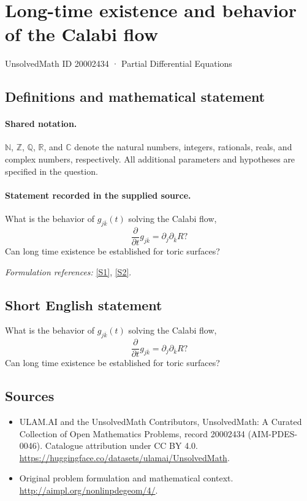 \documentclass[11pt]{article}
\newcommand{\sref}[2]{\hyperlink{source:#1:#2}{[S#2]}}
\begin{document}
\setcounter{section}{20002433}
\section{Long-time existence and behavior of the Calabi flow}\label{20002434}
{\small UnsolvedMath ID 20002434 · Partial Differential Equations}
\subsection{Definitions and mathematical statement}

\paragraph{Shared notation.}$\mathbb N$, $\mathbb Z$, $\mathbb Q$, $\mathbb R$, and $\mathbb C$ denote the natural numbers, integers, rationals, reals, and complex numbers, respectively. All additional parameters and hypotheses are specified in the question.


\paragraph{Statement recorded in the supplied source.}
What is the behavior of $g_{j \overline k}(t)$ solving the Calabi flow,
\[\frac \partial {\partial t} g_{j \overline k} = \partial_j \partial_{\overline k} R?\]
Can long time existence be established for toric surfaces?
\par\smallskip\textit{Formulation references:} \sref{20002434}{1}, \sref{20002434}{2}.
\subsection{Short English statement}
What is the behavior of $g_{j \overline k}(t)$ solving the Calabi flow,
\[\frac \partial {\partial t} g_{j \overline k} = \partial_j \partial_{\overline k} R?\]
Can long time existence be established for toric surfaces?
\subsection{Sources}
\begin{itemize}
\item[\hypertarget{source:20002434:1}{S1}] ULAM.AI and the UnsolvedMath Contributors, UnsolvedMath: A Curated Collection of Open Mathematics Problems, record 20002434 (AIM-PDES-0046). Catalogue attribution under CC BY 4.0.
\url{https://huggingface.co/datasets/ulamai/UnsolvedMath}.
\item[\hypertarget{source:20002434:2}{S2}] Original problem formulation and mathematical context.
\url{http://aimpl.org/nonlinpdegeom/4/}.
\end{itemize}
\label{end:20002434}
\end{document}
